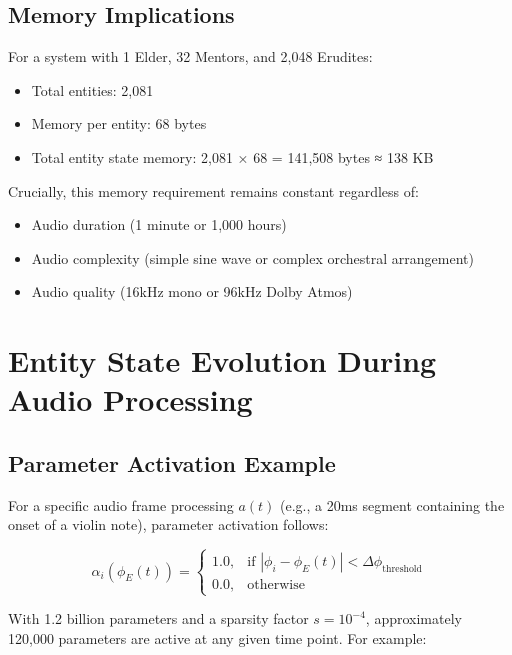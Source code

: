 \subsection{Memory Implications}

For a system with 1 Elder, 32 Mentors, and 2,048 Erudites:
\begin{itemize}
    \item Total entities: 2,081
    \item Memory per entity: 68 bytes
    \item Total entity state memory: 2,081 × 68 = 141,508 bytes ≈ 138 KB
\end{itemize}

Crucially, this memory requirement remains constant regardless of:
\begin{itemize}
    \item Audio duration (1 minute or 1,000 hours)
    \item Audio complexity (simple sine wave or complex orchestral arrangement)
    \item Audio quality (16kHz mono or 96kHz Dolby Atmos)
\end{itemize}

\section{Entity State Evolution During Audio Processing}

\subsection{Parameter Activation Example}

For a specific audio frame processing $a(t)$ (e.g., a 20ms segment containing the onset of a violin note), parameter activation follows:

\begin{equation}
\alpha_i(\phi_E(t)) = \begin{cases}
1.0, & \text{if } |\phi_i - \phi_E(t)| < \Delta\phi_{\text{threshold}} \\
0.0, & \text{otherwise}
\end{cases}
\end{equation}

With 1.2 billion parameters and a sparsity factor $s = 10^{-4}$, approximately 120,000 parameters are active at any given time point. For example:

